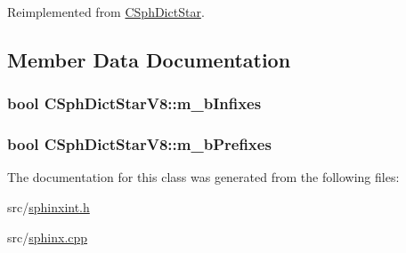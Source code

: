 Reimplemented from \hyperlink{classCSphDictStar_a4e569ff418bf922b57c9c22c30d40bc9}{C\-Sph\-Dict\-Star}.



\subsection{Member Data Documentation}
\hypertarget{classCSphDictStarV8_af69c0f5ab8655132b79d6bcd0a7a79bd}{
\subsubsection[{m\-\_\-b\-Infixes}]{\setlength{\rightskip}{0pt plus 5cm}bool C\-Sph\-Dict\-Star\-V8\-::m\-\_\-b\-Infixes\hspace{0.3cm}{\ttfamily [private]}}}\label{classCSphDictStarV8_af69c0f5ab8655132b79d6bcd0a7a79bd}
\hypertarget{classCSphDictStarV8_ae01b72441144a8cf1b7fcc4a67369d92}{
\subsubsection[{m\-\_\-b\-Prefixes}]{\setlength{\rightskip}{0pt plus 5cm}bool C\-Sph\-Dict\-Star\-V8\-::m\-\_\-b\-Prefixes\hspace{0.3cm}{\ttfamily [private]}}}\label{classCSphDictStarV8_ae01b72441144a8cf1b7fcc4a67369d92}


The documentation for this class was generated from the following files\-:\begin{DoxyCompactItemize}
\item 
src/\hyperlink{sphinxint_8h}{sphinxint.\-h}\item 
src/\hyperlink{sphinx_8cpp}{sphinx.\-cpp}\end{DoxyCompactItemize}
